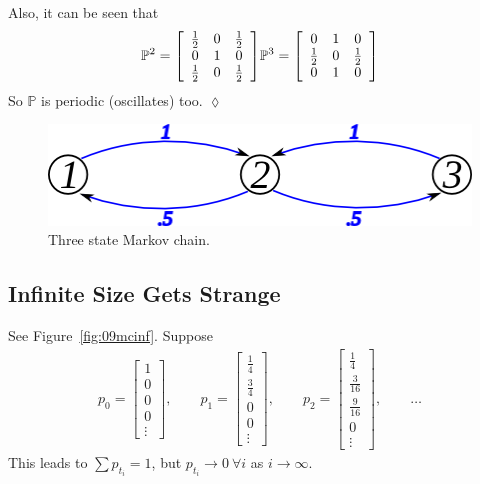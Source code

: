 \begin{example}
Also, it can be seen that
\begin{align*}
\begin{split}
\mathbb{P}^2 = \left[\begin{array}{c c c} \frac{1}{2} & 0 & \frac{1}{2} \\ 0 & 1 & 0 \\ \frac{1}{2} & 0 & \frac{1}{2} \end{array}\right]
\end{split}
\begin{split}
\mathbb{P}^3 = \left[\begin{array}{c c c} 0 & 1 & 0 \\ \frac{1}{2} & 0 & \frac{1}{2} \\ 0 & 1 & 0 \end{array}\right]
\end{split}
\end{align*}
So $\mathbb{P}$ is periodic (oscillates) too.
$\lozenge$
\end{example}

\begin{figure}[ht!]
\centering
\includegraphics[width=.4\textwidth]{images/09mc3}
\caption{Three state Markov chain.}
\label{fig:09mc3}
\end{figure}

\subsection{Infinite Size Gets Strange}
See Figure~\ref{fig:09mcinf}.
Suppose
\begin{align*}
p_0 = \left[\begin{array}{c} 1 \\ 0 \\ 0 \\ 0 \\ \vdots \end{array}\right],
\qquad p_1 = \left[\begin{array}{c} \frac{1}{4} \\ \frac{3}{4} \\ 0 \\ 0 \\ \vdots \end{array}\right],
\qquad p_2 = \left[\begin{array}{c} \frac{1}{4} \\ \frac{3}{16} \\ \frac{9}{16} \\ 0 \\ \vdots \end{array}\right],
\qquad \ldots
\end{align*}
This leads to $\sum p_{t_i}=1$, but $p_{t_i}\rightarrow 0~\forall i$ as $i\to\infty$.

